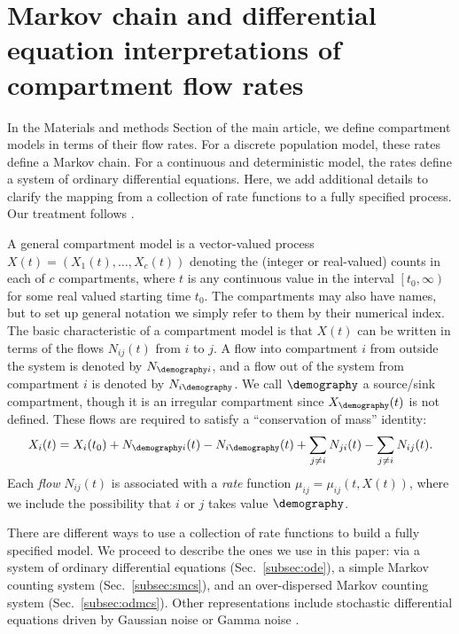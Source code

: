 \section{Markov chain and differential equation interpretations of compartment flow rates}

In the Materials and methods Section of the main article, we define compartment models in terms of their flow rates.
For a discrete population model, these rates define a Markov chain.
For a continuous and deterministic model, the rates define a system of ordinary differential equations.
Here, we add additional details to clarify the mapping from a collection of rate functions to a fully specified process.
Our treatment follows \cite{breto09}.

A general compartment model is a vector-valued process $X(t)=(X_1(t),\dots,X_c(t))$ denoting the (integer or real-valued) counts in each of $c$ compartments, where $t$ is any continuous value in the interval  $\left[t_0, \infty\right)$ for some real valued starting time $t_0$.
The compartments may also have names, but to set up general notation we simply refer to them by their numerical index.
The basic characteristic of a compartment model is that $X(t)$ can be written in terms of the flows $N_{ij}(t)$ from $i$ to $j$.
A flow into compartment $i$ from outside the system is denoted by $N_{\demography i}$, and a flow out of the system from compartment $i$ is denoted by $N_{i\demography}$.
We call $\demography$ a source/sink compartment, though it is an irregular compartment since $X_{\demography}(t)$ is not defined.
These flows are required to satisfy a ``conservation of mass'' identity:
\begin{equation}
X_i(t)=X_i(t_0)+N_{\demography i}(t) - N_{i\demography}(t) + \sum_{j\neq
i}N_{ji}(t)-\sum_{j\neq i}N_{ij}(t). \label{eq:conservation}
\end{equation}
Each {\em flow} $N_{ij}(t)$ is associated with a {\em rate} function
$\mu_{ij}=\mu_{ij}(t,X(t))$, where we include the possibility that $i$ or $j$ takes value $\demography$.

There are different ways to use a collection of rate functions to build a fully specified model.
We proceed to describe the ones we use in this paper: via a system of ordinary differential equations (Sec.~\ref{subsec:ode}), a simple Markov counting system (Sec.~\ref{subsec:smcs}), and an over-dispersed Markov counting system (Sec.~\ref{subsec:odmcs}). Other representations include stochastic differential equations driven by Gaussian noise or Gamma noise \cite{bhadra11}.

